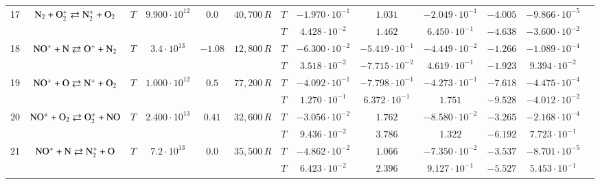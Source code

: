 \documentclass{warpdoc}
\begin{document}
\begin{table}[!ht]
\begin{center}
\begin{threeparttable}
\begin{tabular}{ccccccccccccc}
                                          
17 & $\rm N_2 + O_2^+ \rightleftarrows N_2^+ + O_2 $ &$T$ & $9.900 \cdot 10^{12}$ & $0.0$ & $40,700\, R$ 
                                          &$T$  & $-1.970 \cdot 10^{-1}$  & $1.031$  & $-2.049 \cdot 10^{-1}$ & $-4.005$ & $-9.866 \cdot 10^{-5}$ & \multirow{2}{*}{\cite{book:1990:park,ijhmt:2021:kim}} \\
 & & & & &                                &$T$  & $4.428 \cdot 10^{-2}$  & $1.462$  & $6.450 \cdot 10^{-1}$ & $-4.638$ & $-3.600 \cdot 10^{-2}$ & ~ \\
 
                                         
18 & $\rm NO^+ + N \rightleftarrows O^+ + N_2 $ &$T$ & $3.4 \cdot 10^{13}$ & $-1.08$ & $12,800\, R$ 
                                          &$T$  & $-6.300 \cdot 10^{-2}$  & $-5.419 \cdot 10^{-1}$  & $-4.449 \cdot 10^{-2}$ & $-1.266$ & $-1.089 \cdot 10^{-4}$ & \multirow{2}{*}{\cite{book:1990:park,ijhmt:2021:kim}} \\
 & & & & &                                &$T$  & $3.518 \cdot 10^{-2}$  & $-7.715 \cdot 10^{-2}$  & $4.619 \cdot 10^{-1}$ & $-1.923$ & $9.394 \cdot 10^{-2}$ & ~ \\
 
                                          
19 & $\rm NO^+ + O \rightleftarrows N^+ + O_2 $ &$T$ & $1.000 \cdot 10^{12}$ & $0.5$ & $77,200\, R$ 
                                          &$T$  & $-4.092 \cdot 10^{-1}$  & $-7.798 \cdot 10^{-1}$  & $-4.273 \cdot 10^{-1}$ & $-7.618$ & $-4.475 \cdot 10^{-4}$ & \multirow{2}{*}{\cite{book:1990:park,ijhmt:2021:kim}} \\
 & & & & &                                &$T$  & $1.270 \cdot 10^{-1}$  & $6.372 \cdot 10^{-1}$  & $1.751$ & $-9.528$ & $-4.012 \cdot 10^{-2}$ & ~ \\
 
                                          
20 & $\rm NO^{+} + O_2 \rightleftarrows O_2^{+} + NO $ &$T$ & $2.400 \cdot 10^{13}$ & $0.41$ & $32,600\, R$ 
                                          &$T$  & $-3.056 \cdot 10^{-2}$  & $1.762$  & $-8.580 \cdot 10^{-2}$ & $-3.265$ & $-2.168 \cdot 10^{-4}$ & \multirow{2}{*}{\cite{book:1990:park,ijhmt:2021:kim}} \\
 & & & & &                                &$T$  & $9.436 \cdot 10^{-2}$  & $3.786$  & $1.322$ & $-6.192$ & $7.723 \cdot 10^{-1}$ & ~ \\
 
                                          
21 & $\rm NO^+ + N \rightleftarrows N_2^+ + O $ &$T$ & $7.2 \cdot 10^{13}$ & $0.0$ & $35,500\, R$ 
                                          &$T$  & $-4.862 \cdot 10^{-2}$  & $1.066$  & $-7.350 \cdot 10^{-2}$ & $-3.537$ & $-8.701 \cdot 10^{-5}$ & \multirow{2}{*}{\cite{book:1990:park,ijhmt:2021:kim}} \\
 & & & & &                                &$T$  & $6.423 \cdot 10^{-2}$  & $2.396$  & $9.127 \cdot 10^{-1}$ & $-5.527$ & $5.453 \cdot 10^{-1}$ & ~ \\
 

\end{tabular}
\end{threeparttable}
\end{center}
\end{table}
\end{document}
